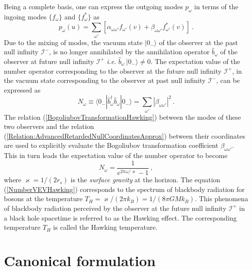 \documentclass[aps,twocolumn,showpacs]{revtex4}
\def\ksg{\mathrm{\varkappa}}
\def\rs{r_s}
\def\scriplus{\mathscr{I}^{+}}
\def\scriminus{\mathscr{I}^{-}}
\begin{document}
Being a complete basis, one can express the outgoing modes $p_{\omega}$ in 
terms of the ingoing modes $\{{f}_{\omega}\}$ and $\{{f}^{*}_{\omega}\}$ as
%
\begin{equation}\label{BogoliubovTransformationHawking}
{p}_{\omega}(u) =  \sum_{\omega'} \left[ \alpha_{\omega\omega'} {f}_{\omega'}(v)
+ \beta_{\omega\omega'} {f}^{*}_{\omega'}(v) \right] ~.
\end{equation}
%
Due to the mixing of modes, the vacuum state $|0_{-}\rangle$ of the observer at 
the past null infinity $\scriminus$, is no longer annihilated by the 
annihilation operator $\hat{b}_{\omega}$ of the observer at future null 
infinity 
$\scriplus$ \emph{i.e.} $\hat{b}_{\omega}~|0_{-}\rangle \ne 0$. The expectation 
value of the number operator corresponding to the observer at the future null 
infinity $\scriplus$, in the vacuum state corresponding to the observer at 
past null infinity $\scriminus$, can be expressed as
%
\begin{equation}\label{NumberVEVDefinitionHawking}
{N}_{\omega} \equiv 
\langle 0_{-}| \hat{b}^{\dagger}_{\omega} \hat{b}_{\omega} |0_{-}\rangle
=  \sum_{\omega'} |\beta_{\omega\omega'}|^2 ~.
\end{equation}
%
The relation (\ref{BogoliubovTransformationHawking}) between the modes of these 
two observers and the relation 
(\ref{Relation:AdvancedRetardedNullCoordinatesApprox}) between their 
coordinates are used to explicitly evaluate the Bogoliubov transformation
coefficient $\beta_{\omega\omega'}$. This in turn leads the expectation 
value of the number operator to become
%
\begin{equation}\label{NumberVEVHawking}
{N}_{\omega} = \frac{1}{e^{2\pi\omega/\ksg} - 1}  ~,
\end{equation}
%
where $\ksg=1/(2\rs)$ is the \emph{surface gravity} at the horizon. The 
equation 
(\ref{NumberVEVHawking}) corresponds to the spectrum of blackbody radiation for 
bosons at the temperature $T_H = \ksg/(2\pi k_B) = 1/(8\pi G M k_B)$. This 
phenomena of blackbody radiation perceived by the observer at the future null 
infinity $\scriplus$ in a black hole spacetime is referred to as the Hawking 
effect. The corresponding temperature $T_H$ is called the Hawking temperature. 




\section{Canonical formulation}\label{Canonical-formulation}
\end{document}
